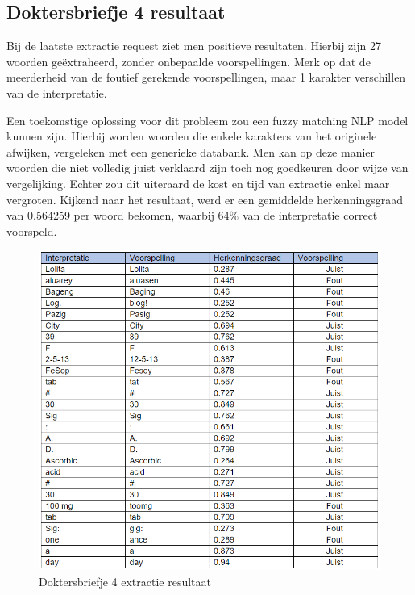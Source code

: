 \subsection{Doktersbriefje 4 resultaat}
Bij de laatste extractie request ziet men positieve resultaten. Hierbij zijn 27 woorden geëxtraheerd, zonder onbepaalde voorspellingen. Merk op dat de meerderheid van de foutief gerekende voorspellingen, maar 1 karakter verschillen van de interpretatie. 


Een toekomstige oplossing voor dit probleem zou een fuzzy matching NLP model kunnen zijn. Hierbij worden woorden die enkele karakters van het originele afwijken, vergeleken met een generieke databank. Men kan op deze manier woorden die niet volledig juist verklaard zijn toch nog goedkeuren door wijze van vergelijking. Echter zou dit uiteraard de kost en tijd van extractie enkel maar vergroten. Kijkend naar het resultaat, werd er een gemiddelde herkenningsgraad van 0.564259 per woord bekomen, waarbij  64\% van de interpretatie correct voorspeld. 
\begin{figure}[h]
	
	\includegraphics[width=\textwidth,height=\textheight,keepaspectratio]{../Foto's/doktersbriefje4_tabel}
	\captionsetup{justification=centering,margin=2cm}
	\caption{Doktersbriefje 4 extractie resultaat}
	\centering
\end{figure}
